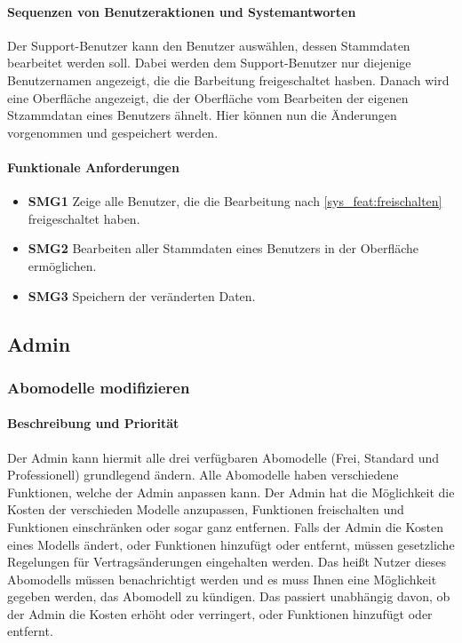 \paragraph{Sequenzen von Benutzeraktionen und Systemantworten}
Der Support-Benutzer kann den Benutzer auswählen, dessen Stammdaten bearbeitet werden soll. Dabei werden dem Support-Benutzer nur diejenige Benutzernamen angezeigt, die die Barbeitung freigeschaltet hasben. Danach wird eine Oberfläche angezeigt, die der Oberfläche vom Bearbeiten der eigenen Stzammdatan eines Benutzers ähnelt. Hier können nun die Änderungen vorgenommen und gespeichert werden. 
\paragraph{Funktionale Anforderungen}
\begin{itemize}
	\item \textbf{SMG1} Zeige alle Benutzer, die die Bearbeitung nach \ref{sys_feat:freischalten} freigeschaltet haben.
	\item \textbf{SMG2} Bearbeiten aller Stammdaten eines Benutzers in der Oberfläche ermöglichen.
	\item \textbf{SMG3} Speichern der veränderten Daten. 
\end{itemize}

\subsection{Admin}
\subsubsection{Abomodelle modifizieren}
\paragraph{Beschreibung und Priorität}
Der Admin kann hiermit alle drei verfügbaren Abomodelle (Frei, Standard und Professionell) grundlegend ändern. Alle Abomodelle haben verschiedene Funktionen, welche der Admin anpassen kann. Der Admin hat die Möglichkeit die Kosten der verschieden Modelle anzupassen, Funktionen freischalten und Funktionen einschränken oder sogar ganz entfernen. Falls der Admin die Kosten eines Modells ändert, oder Funktionen hinzufügt oder entfernt, müssen gesetzliche Regelungen für Vertragsänderungen eingehalten werden. Das heißt Nutzer dieses Abomodells müssen benachrichtigt werden und es muss Ihnen eine Möglichkeit gegeben werden, das Abomodell zu kündigen. Das passiert unabhängig davon, ob der Admin die Kosten erhöht oder verringert, oder Funktionen hinzufügt oder entfernt. 
